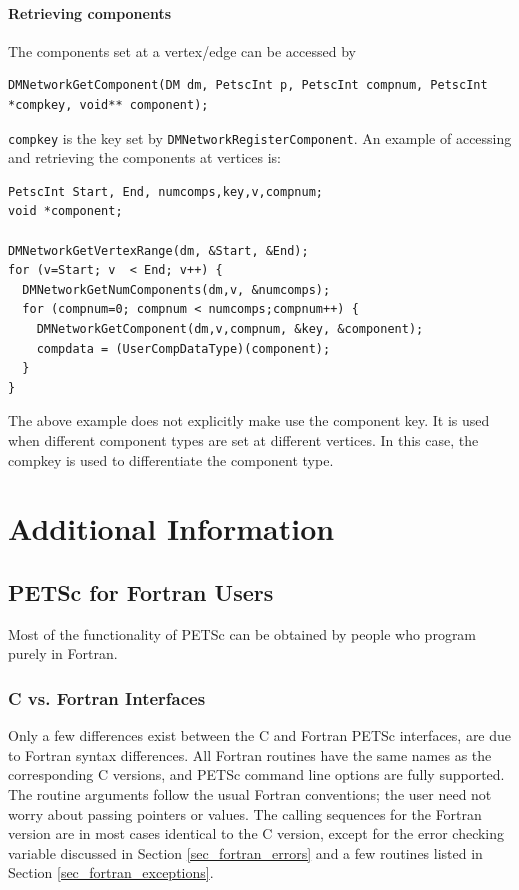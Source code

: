 \subsection{Retrieving components}
The components set at a vertex/edge can be accessed by
\begin{lstlisting}
DMNetworkGetComponent(DM dm, PetscInt p, PetscInt compnum, PetscInt *compkey, void** component);
\end{lstlisting}
\lstinline{compkey} is the key set by \lstinline{DMNetworkRegisterComponent}. An example of accessing and retrieving the components at vertices is:

\begin{lstlisting}
PetscInt Start, End, numcomps,key,v,compnum;
void *component;

DMNetworkGetVertexRange(dm, &Start, &End);
for (v=Start; v  < End; v++) {
  DMNetworkGetNumComponents(dm,v, &numcomps);
  for (compnum=0; compnum < numcomps;compnum++) {
    DMNetworkGetComponent(dm,v,compnum, &key, &component);
    compdata = (UserCompDataType)(component);
  }
}
\end{lstlisting}
The above example does not explicitly make use the component key. It is used when different component types are set at different vertices. In this case, the {compkey} is used to differentiate the component type.

\cleardoublepage
\part{Additional Information}
\label{part_usefulstuff}

\cleardoublepage
\chapter{PETSc for Fortran Users}
\label{ch_fortran}

Most of the functionality of PETSc can be obtained by people who
program purely in Fortran.

\section{C vs. Fortran Interfaces}

Only a few differences exist between the C and Fortran PETSc
interfaces, are due to Fortran syntax differences.
All Fortran routines have the same names as the corresponding C
versions, and PETSc command line options are fully supported. The
routine arguments follow the usual Fortran conventions; the user need
not worry about passing pointers or values.  The calling sequences
for the Fortran version are in most cases identical to the C version,
except for the error checking variable discussed in
Section \ref{sec_fortran_errors} and a few routines listed in
Section \ref{sec_fortran_exceptions}.

